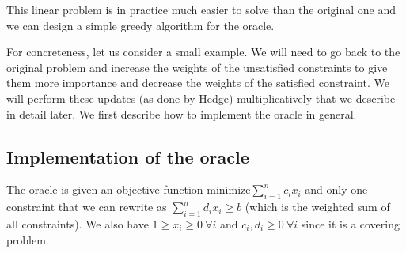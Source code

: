 This linear problem is in practice much easier to solve than the original one and we can design a
simple greedy algorithm for the oracle.

For concreteness, let us consider a small example. 
We will need to go back to the original problem and increase the weights of the unsatisfied
constraints to give them more importance and decrease the weights of the satisfied constraint. We
will perform these updates (as done by Hedge) multiplicatively that we describe in detail later. We first describe how to implement the oracle in general.

\subsection{Implementation of the oracle}

The oracle is given an objective function $\text{minimize}\sum_{i=1}^n c_i x_i$ and only one
constraint that we can rewrite as $\sum_{i=1}^n d_i x_i\ge b$ (which is the weighted sum of all
constraints). We also have $1\ge x_i\ge 0\ \forall i$ and $c_i,d_i\ge 0\ \forall i$ since it is a
covering problem.

